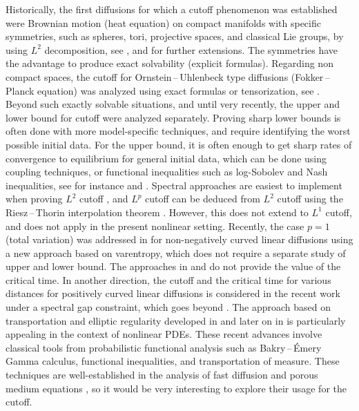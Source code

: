 \documentclass[10pt,reqno]{amsart}
\numberwithin{equation}{section}
\begin{document}
Historically, the first diffusions for which a cutoff phenomenon was established were Brownian motion (heat equation) on compact manifolds with specific symmetries, such as spheres, tori, projective spaces, and classical Lie groups, by using $L^2$ decomposition, see \cite{MR1306030}, and \cite{Meliot14} for further extensions. The symmetries have the advantage to produce exact solvability (explicit formulas).
Regarding non compact spaces, the cutoff for Ornstein\,--\,Uhlenbeck type diffusions (Fokker\,--\,Planck equation) was analyzed using exact formulas or tensorization, see  \cite{MR2260742,MR2203823,MR3770869}. Beyond such exactly solvable situations, and until very recently, the upper and lower bound for cutoff were analyzed separately. Proving sharp lower bounds is often done with more model-specific techniques, and require identifying the worst possible initial data. For the upper bound, it is often enough to get sharp rates of convergence to equilibrium for general initial data, which can be done using coupling techniques, or functional inequalities such as log-Sobolev and Nash inequalities, see for instance \cite{MR1306030} and \cite{chafathi}. Spectral approaches are easiest to implement when proving $L^2$ cutoff \cite{MR2584746}, and $L^p$ cutoff can be deduced from $L^2$ cutoff using the Riesz\,--\,Thorin interpolation theorem \cite{MR2375599}. However, this does not extend to $L^1$ cutoff, and does not apply in the present nonlinear setting. Recently, the case $p=1$ (total variation) was addressed in \cite{Salez25} for non-negatively curved linear diffusions using a new approach based on varentropy, which does not require a separate study of upper and lower bound. The approaches in \cite{MR2375599} and \cite{Salez25} do not provide the value of the critical time. In another direction, the cutoff and the critical time for various distances for positively curved linear diffusions is considered in the recent work \cite{chafathi} under a spectral gap constraint, which goes beyond \cite{MR4528974}. The approach based on transportation and elliptic regularity developed in \cite{chafathi} and later on in \cite{pedrotti2025transportapproachcutoffphenomenon} is particularly appealing in the context of nonlinear PDEs. These recent advances involve classical tools from probabilistic functional analysis such as Bakry\,--\,Émery Gamma calculus, functional inequalities, and transportation of measure. These techniques are well-established in the analysis of fast diffusion and porous medium equations \cite{zbMATH06133917}, so it would be very interesting to explore their usage for the cutoff.
\end{document}
